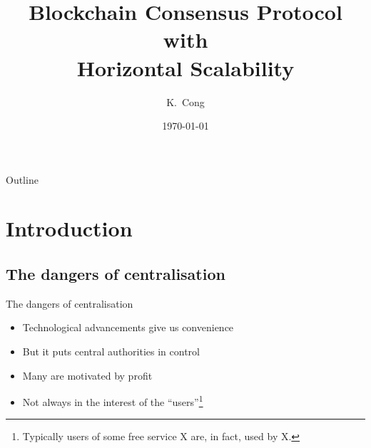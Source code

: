 \documentclass{beamer}
\title{Blockchain Consensus Protocol with\\Horizontal Scalability}
\author{K.~Cong}
\institute[Delft University of Technology] %
{
  Faculty of Electrical Engineering, Mathematics and Computer Science\\
  Delft University of Technology}
\date{\today}
\begin{document}
\begin{frame}
  \titlepage

\end{frame}

\begin{frame}{Outline}
  \tableofcontents[]
\end{frame}

\section{Introduction}
\subsection{The dangers of centralisation}
\begin{frame}{The dangers of centralisation}
  \begin{itemize}
    \item Technological advancements give us convenience
    \item But it puts central authorities in control
    \item Many are motivated by profit
    \item Not always in the interest of the ``users''\footnote{Typically users of some free service X are, in fact, used by X.}
  \end{itemize}
\end{frame}
\end{document}
